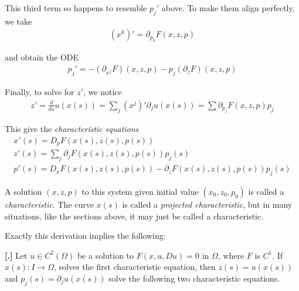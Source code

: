 \documentclass{article}
\newcommand{\pd}{\partial}
\newcounter{result}[section]
\newenvironment{res}[1][]{\vspace{0.5 cm} \refstepcounter{result}\par\medskip
	\noindent \textbf{[\thesection.\theresult] #1} \rmfamily}{\vspace{0.5 cm}}
\begin{document}
	This third term so happens to resemble $p_{j}'$ above. To make them align perfectly, we take 
	\begin{align*}
		(x^k)' = \pd_{p_k}F(x,z,p)
	\end{align*} 
	
	and obtain the ODE
	\begin{align*}
		p_{j}' = -(\pd_{x^j}F)(x,z,p) - p_{j}(\pd_{z}F)(x,z,p)
	\end{align*}
	
	Finally, to solve for $z'$, we notice 
	\begin{align*}
		z' = \frac{d}{ds} u(x(s)) = \sum_{j} (x^j)' \pd_{j}u(x(s)) = \sum \pd_{p_j}F(x,z,p)p_j
	\end{align*}
	
	This give the \textit{characteristic equations}
	\begin{align*}
		x'(s) = D_p F(x(s),z(s),p(s)) \\
		z'(s) = \sum_{j}\pd_{j}F(x(s),z(s),p(s))p_{j}(s) \\
		p'(s) = D_{x}F(x(s),z(s),p(s)) - \pd_{z}F(x(s),z(s),p(s))p_j(s)
	\end{align*}
	
	A solution $(x,z,p)$ to this system given initial value $(x_0,z_0,p_0)$ is called a \textit{characteristic}. The curve $x(s)$ is called a \textit{projected characteristic}, but in many situations, like the sections above, it may just be called a characteristic. 
	
	Exactly this derivation implies the following:
	
	\begin{res}
		Let $u \in C^{2}(\Omega)$ be a solution to $F(x,u,Du) = 0$ in $\Omega$, where $F$ is $C^{1}$. If $x(s): I \to \Omega$, solves the first characteristic equation, then $z(s) = u(x(s))$ and $p_{j}(s) = \pd_{j}u(x(s))$ solve the following two characteristic equations. 
	\end{res}
	
	
%	
%	
%	
%	
	
\end{document}
